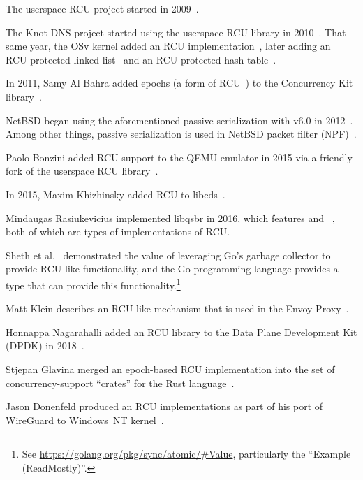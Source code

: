 The userspace RCU project started in 2009~\cite{MathieuDesnoyers2009URCU}.

The Knot DNS project started using the userspace RCU
library in 2010~\cite{LubosSlovak2010KnotDNSRCU}.
That same year, the OSv kernel added an RCU
implementation~\cite{AviKivity2013OSvRCU},
later adding an RCU-protected linked list~\cite{AviKivity2013OSvRCUlist}
and an RCU-protected hash table~\cite{AviKivity2013OSvRCUhash}.

In 2011, Samy Al Bahra added epochs
(a form of RCU~\cite{UCAM-CL-TR-579,KeirFraser2007withoutLocks})
to the Concurrency Kit
library~\cite{SamyAlBahra2011ckEpoch}.

NetBSD began using the aforementioned passive serialization with v6.0 in
2012~\cite{NetBSD2012pserialize}.
Among other things, passive serialization is used in
NetBSD packet filter (NPF)~\cite{MindaugasRasiukevicius2014NPFRCU}.

Paolo Bonzini added RCU support to the QEMU emulator in 2015 via a
friendly fork of the userspace RCU
library~\cite{MikeDay2013RCUqemu,PaoloBonzini2013QEMURCU}.

In 2015, Maxim Khizhinsky added RCU to
libcds~\cite{MaxKhiszinsky2015C++RCU}.

Mindaugas Rasiukevicius implemented libqsbr in 2016, which features
 and ~\cite{MindaugasRasiukevicius2016libqsbr},
both of which are types of implementations of RCU\@.

Sheth et al.~\cite{HarshalSheth2016goRCU}
demonstrated the value of leveraging Go's garbage
collector to provide RCU-like functionality, and
the Go programming language provides a  type that can
provide this functionality.\footnote{
	See \url{https://golang.org/pkg/sync/atomic/\#Value}, particularly
	the ``Example (ReadMostly)''.}

Matt Klein describes an RCU-like mechanism that is used in the Envoy
Proxy~\cite{MattKlein2017EnvoyRCU}.

Honnappa Nagarahalli added an RCU library to the Data Plane Development
Kit (DPDK) in 2018~\cite{HonnappaNagarahalli2018dpdkRCU}.

Stjepan Glavina merged an epoch-based RCU implementation into the
 set of concurrency-support ``crates'' for the Rust
language~\cite{StjepanGlavina2018RustRCU}.

Jason Donenfeld produced an RCU implementations as part of his port of
WireGuard to Windows~NT kernel~\cite{JasonDonenfeld2021:WindowsNTwireguardRCU}.


